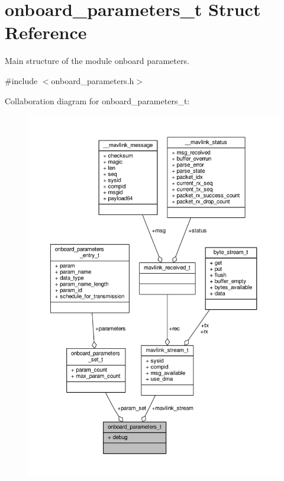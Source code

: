 \hypertarget{structonboard__parameters__t}{\section{onboard\+\_\+parameters\+\_\+t Struct Reference}
\label{structonboard__parameters__t}
}


Main structure of the module onboard parameters.  




{\ttfamily \#include $<$onboard\+\_\+parameters.\+h$>$}



Collaboration diagram for onboard\+\_\+parameters\+\_\+t\+:
\nopagebreak
\begin{figure}[H]
\begin{center}
\leavevmode
\includegraphics[width=350pt]{structonboard__parameters__t__coll__graph}
\end{center}
\end{figure}

